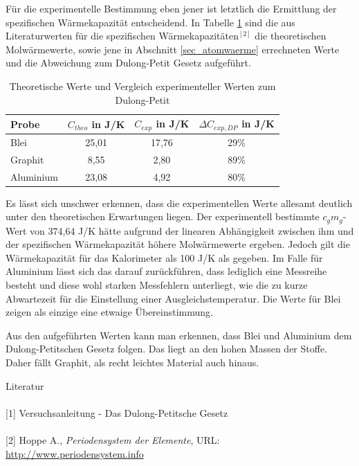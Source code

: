 Für die experimentelle Bestimmung eben jener ist letztlich die Ermittlung der spezifischen Wärmekapazität entscheidend. In Tabelle 
\ref{tab_diskussion} sind die aus Literaturwerten für die spezifischen Wärmekapazitäten$^{[2]}$ die theoretischen Molwärmewerte, sowie
jene in Abschnitt \ref{sec_atomwaerme} errechneten Werte und die Abweichung zum Dulong-Petit Gesetz aufgeführt.
\begin{table}[H]
 \begin{tabular}{l|c|c|c}
 Probe & $C_{theo}$ in J/K	& $C_{exp}$ in J/K & $\Delta C_{exp,DP}$ in J/K\\
 \hline
Blei	&25,01	&17,76	&29\% \\
Graphit	&8,55	&2,80	&89\% \\
Aluminium	&23,08	&4,92	&80\% 
 \end{tabular}
\caption{Theoretische Werte und Vergleich experimenteller Werten zum Dulong-Petit}
\label{tab_diskussion}
\end{table}

Es lässt sich unschwer erkennen, dass die experimentellen Werte allesamt deutlich unter den theoretischen Erwartungen liegen. Der 
experimentell bestimmte $c_gm_g$-Wert von 374,64 J/K hätte aufgrund der linearen Abhängigkeit zwischen ihm und der spezifischen 
Wärmekapazität höhere Molwärmewerte ergeben. Jedoch gilt die Wärmekapazität für das Kalorimeter als 100 J/K als gegeben. Im Falle
für Aluminium lässt sich das darauf zurückführen, dass lediglich eine Messreihe besteht und diese wohl starken Messfehlern unterliegt,
wie die zu kurze Abwartezeit für die Einstellung einer Ausgleichstemperatur. Die Werte für Blei zeigen als einzige eine etwaige 
Übereinstimmung.

Aus den aufgeführten Werten kann man erkennen, dass Blei und Aluminium dem Dulong-Petitschen Gesetz folgen. Das liegt an den hohen Massen
der Stoffe. Daher fällt Graphit, als recht leichtes Material auch hinaus.

\parskip 400pt
\Large{Literatur}\\\\
\large{[1] Versuchsanleitung - Das Dulong-Petitsche Gesetz}\\\\
\large{[2] Hoppe A., \textit{Periodensystem der Elemente}, URL: \href{http://www.periodensystem.info}{http://www.periodensystem.info}}\\\\





